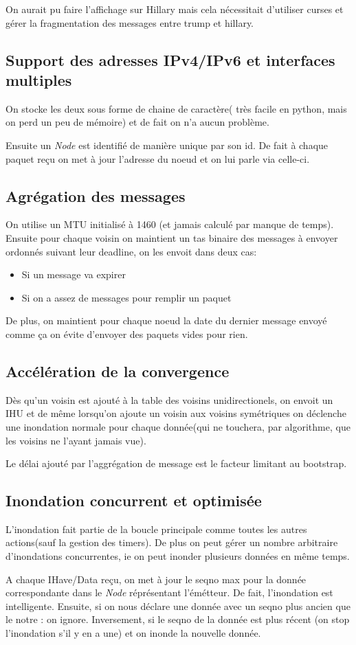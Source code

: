 \documentclass{article}
\begin{document}
On aurait pu faire l'affichage sur Hillary mais cela nécessitait d'utiliser curses et 
gérer la fragmentation des messages entre trump et hillary.

\subsection{Support des adresses IPv4/IPv6 et interfaces multiples}
On stocke les deux sous forme de chaine de caractère( très facile en python, mais on 
perd un peu de mémoire) et de fait on n'a aucun problème.

Ensuite un \textit{Node} est identifié de manière unique par son id. De fait à chaque paquet reçu on met à jour 
l'adresse du noeud et on lui parle via celle-ci.

\subsection{Agrégation des messages}
On utilise un MTU initialisé à 1460 (et jamais calculé par manque de temps). 
Ensuite pour chaque voisin on maintient un tas binaire des messages à envoyer ordonnés suivant 
leur deadline, on les envoit dans deux cas:
  \begin{itemize}
   \item Si un message va expirer
   \item Si on a assez de messages pour remplir un paquet
  \end{itemize}
De plus, on maintient pour chaque noeud la date du dernier message envoyé comme ça on évite d'envoyer des paquets vides pour rien.

\subsection{Accélération de la convergence}
Dès qu'un voisin est ajouté à la table des voisins unidirectionels, on envoit un IHU et de même lorsqu'on ajoute un voisin aux voisins 
symétriques on déclenche une inondation normale pour chaque donnée(qui ne touchera, par algorithme, que les voisins ne l'ayant jamais vue).

Le délai ajouté par l'aggrégation de message est le facteur limitant au bootstrap. 

\subsection{Inondation concurrent et optimisée}
L'inondation fait partie de la boucle principale comme toutes les autres actions(sauf la gestion des timers). De plus on peut gérer un nombre arbitraire d'inondations concurrentes, 
ie on peut inonder plusieurs données en même temps.

A chaque IHave/Data reçu, on met à jour le seqno max pour la donnée correspondante dans le \textit{Node} réprésentant l'émétteur. De fait, l'inondation est intelligente.
Ensuite, si on nous déclare une donnée avec un seqno plus ancien que le notre : on ignore. Inversement, si le seqno de la donnée est plus récent (on stop l'inondation s'il y 
en a une) et on inonde la nouvelle donnée.
\end{document}
